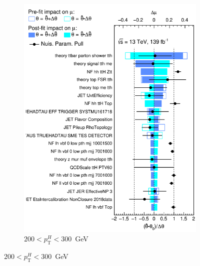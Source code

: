 \begin{figure}[htbp]
\begin{subfigure}[b]{0.45\textwidth}
    \includegraphics[width=\linewidth]{images/fit_stxs/Ranking_r_10_ttH_ptH_200_300.png}
    \caption{\small $200<p_{\text{T}}^{H}<300$~GeV}
    \label{fig:ranking_tth_ptH_200_300}
  \end{subfigure}


\end{figure}
